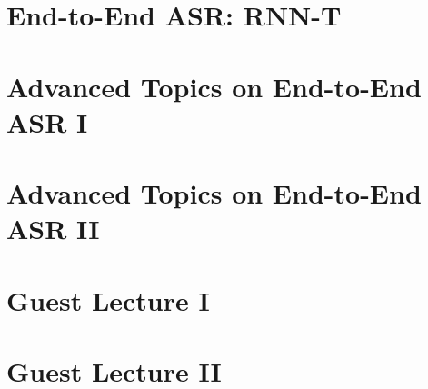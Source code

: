\documentclass[a4paper]{article}
\begin{document}
\section{End-to-End ASR: RNN-T}


\section{Advanced Topics on End-to-End ASR I}


\section{Advanced Topics on End-to-End ASR II}


\section{Guest Lecture I}


\section{Guest Lecture II}

\end{document}
